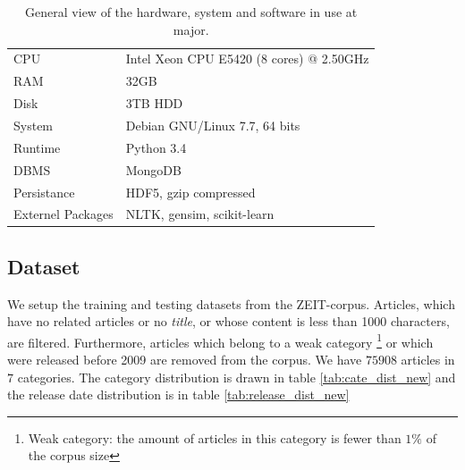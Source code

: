 \begin{table}[!htb]
\begin{tabular}{ll}
CPU & Intel Xeon CPU E5420 (8 cores) @ 2.50GHz \\
RAM & 32GB \\ 
Disk & 3TB HDD \\ 
System & Debian GNU/Linux 7.7, 64 bits \\ 
Runtime & Python 3.4 \\
DBMS & MongoDB \\ 
Persistance & HDF5, gzip compressed \\
Externel Packages & NLTK, gensim, scikit-learn \\
\end{tabular}
\caption{General view of the hardware, system and software in use at major. }
\label{tab:pcinfo}
\end{table}

\subsection{Dataset}

We setup the training and testing datasets from the ZEIT-corpus. Articles, which have no related articles or no \textit{title}, or whose content is less than 1000 characters, are filtered. Furthermore, articles which belong to a weak category \footnote{Weak category: the amount of articles in this category is fewer than $1\%$ of the corpus size} or which were released before 2009 are removed from the corpus. We have $75908$ articles in $7$ categories. The category distribution is drawn in table \ref{tab:cate_dist_new} and the release date distribution is in table \ref{tab:release_dist_new}

